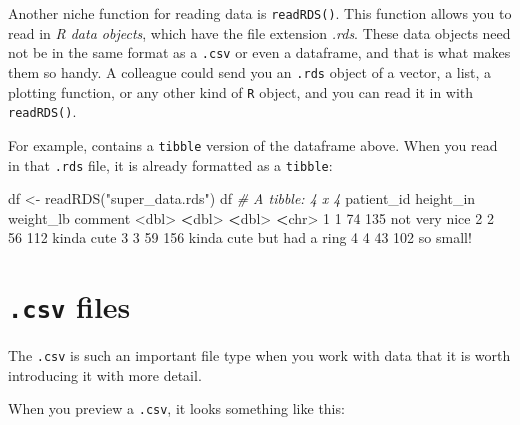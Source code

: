 \documentclass[
]{book}
\newenvironment{Shaded}{\begin{snugshade}}{\end{snugshade}}
\newcommand{\CommentTok}[1]{\textcolor[rgb]{0.56,0.35,0.01}{\textit{#1}}}
\newcommand{\DecValTok}[1]{\textcolor[rgb]{0.00,0.00,0.81}{#1}}
\newcommand{\ErrorTok}[1]{\textcolor[rgb]{0.64,0.00,0.00}{\textbf{#1}}}
\newcommand{\FunctionTok}[1]{\textcolor[rgb]{0.00,0.00,0.00}{#1}}
\newcommand{\NormalTok}[1]{#1}
\newcommand{\OtherTok}[1]{\textcolor[rgb]{0.56,0.35,0.01}{#1}}
\newcommand{\SpecialCharTok}[1]{\textcolor[rgb]{0.00,0.00,0.00}{#1}}
\newcommand{\StringTok}[1]{\textcolor[rgb]{0.31,0.60,0.02}{#1}}
\begin{document}
Another niche function for reading data is \texttt{readRDS()}. This function allows you to read in \emph{R data objects}, which have the file extension \emph{.rds}. These data objects need not be in the same format as a \texttt{.csv} or even a dataframe, and that is what makes them so handy. A colleague could send you an \texttt{.rds} object of a vector, a list, a plotting function, or any other kind of \texttt{R} object, and you can read it in with \texttt{readRDS()}.

For example, contains a \texttt{tibble} version of the dataframe above. When you read in that \texttt{.rds} file, it is already formatted as a \texttt{tibble}:

\begin{Shaded}
\begin{Highlighting}[]
\NormalTok{df }\OtherTok{\textless{}{-}} \FunctionTok{readRDS}\NormalTok{(}\StringTok{"super\_data.rds"}\NormalTok{)}
\NormalTok{df}
\CommentTok{\# A tibble: 4 x 4}
\NormalTok{  patient\_id height\_in weight\_lb comment                  }
       \SpecialCharTok{\textless{}}\NormalTok{dbl}\SpecialCharTok{\textgreater{}}     \ErrorTok{\textless{}}\NormalTok{dbl}\SpecialCharTok{\textgreater{}}     \ErrorTok{\textless{}}\NormalTok{dbl}\SpecialCharTok{\textgreater{}} \ErrorTok{\textless{}}\NormalTok{chr}\SpecialCharTok{\textgreater{}}                    
\DecValTok{1}          \DecValTok{1}        \DecValTok{74}       \DecValTok{135}\NormalTok{ not very nice            }
\DecValTok{2}          \DecValTok{2}        \DecValTok{56}       \DecValTok{112}\NormalTok{ kinda cute               }
\DecValTok{3}          \DecValTok{3}        \DecValTok{59}       \DecValTok{156}\NormalTok{ kinda cute but had a ring}
\DecValTok{4}          \DecValTok{4}        \DecValTok{43}       \DecValTok{102}\NormalTok{ so small}\SpecialCharTok{!}                
\end{Highlighting}
\end{Shaded}

\hypertarget{csv-files}{%
\section*{\texorpdfstring{\texttt{.csv} files}{.csv files}}\label{csv-files}}

The \texttt{.csv} is such an important file type when you work with data that it is worth introducing it with more detail.

When you preview a \texttt{.csv}, it looks something like this:
\end{document}
